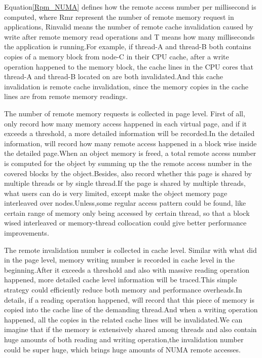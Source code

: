 Equation\ref{Rpm_NUMA} defines how the remote access number per millisecond is computed, where Rmr represent the number of remote memory request in applications, Rinvalid means the number of remote cache invalidation caused by write after remote memory read operations and T means how many milliseconds the application is running.For example, if thread-A and thread-B both contains copies of a memory block from node-C in their CPU cache, after a write operation happened to the memory block, the cache lines in the CPU cores that thread-A and thread-B located on are both invalidated.And this cache invalidation is remote cache invalidation, since the memory copies in the cache lines are from remote memory readings.

The number of remote memory requests is collected in page level. First of all, \NP{} only record how many memory access happened in each virtual page, and if it exceeds a threshold, a more detailed information will be recorded.In the detailed information, \NP{} will record how many remote access happened in a block wise inside the detailed page.When an object memory is freed, a total remote access number is computed for the object by summing up the the remote access number in the covered blocks by the object.Besides, \NP{} also record whether this page is shared by multiple threads or by single thread.If the page is shared by multiple threads, what users can do is very limited, except make the object memory page interleaved over nodes.Unless,some regular access pattern could be found, like certain range of memory only being accessed by certain thread, so that a block wised interleaved or memory-thread collocation could give better performance improvements.

The remote invalidation number is collected in cache level.
Similar with what \NP{} did in the page level, memory writing number is recorded in cache level in the beginning.After it exceeds a threshold and also with massive reading operation happened, more detailed cache level information will be traced.This simple strategy could efficiently reduce both memory and performance overheads.In details, if a reading operation happened, \NP{} will record that this piece of memory is copied into the cache line of the demanding thread.And when a writing operation happened, all the copies in the related cache lines will be invalidated.We can imagine that if the memory is extensively shared among threads and also contain huge amounts of both reading and writing operation,the invalidation number could be super huge, which brings huge amounts of NUMA remote accesses. 

